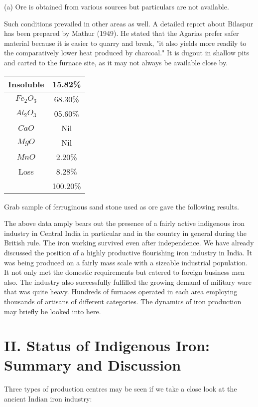 (a) Ore is obtained from various sources but particulars are not available.

Such conditions prevailed in other areas as well.  A detailed report about Bilaspur has been prepared by Mathur (1949). He stated that the Agarias prefer safer material because it is easier to quarry and break, "it also yields more readily to the comparatively lower heat produced by charcoal." It is dugout in shallow pits and carted to the furnace site, as it may not always be available close by.

{\fontsize{9}{11}\selectfont
\begin{center}
\begin{tabular}{|c|c|}
\hline
Insoluble & 15.82\%\\\hline
$Fe_2O_3$ & 68.30\%\\\hline
$Al_2O_3$ & 05.60\%\\\hline
$CaO$ & Nil\\\hline
$MgO$ & Nil\\\hline
$MnO$ & 2.20\%\\\hline
Loss & 8.28\%\\\hline
&100.20\%\\\hline
\end{tabular}
\end{center}
}
Grab sample of ferruginous sand stone used as ore gave the following results.

The above data amply bears out the presence of a fairly active indigenous iron industry in Central India in particular and in the country in general during the British rule. The iron working survived even after independence. We have already discussed the position of a highly productive flourishing iron industry in India.  It was being produced on a fairly mass scale with a sizeable industrial population. It not only met the domestic requirements but catered to foreign business men also. The industry also successfully fulfilled the growing demand of military ware that was quite heavy.  Hundreds of furnaces operated in each area employing thousands of artisans of different categories.  The dynamics of iron production may briefly be looked into here.

\section*{II. Status of Indigenous Iron: Summary and Discussion}\label{section-2}

Three types of production centres may be seen if we take a close look at the ancient Indian iron industry:


